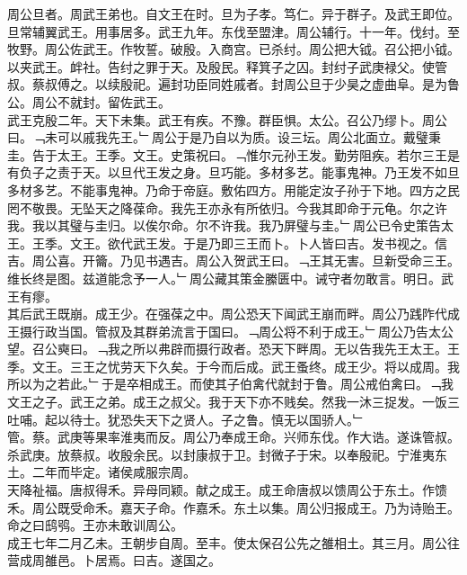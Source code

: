 \documentclass{zhvt-classic}
\begin{document}
\hspace*{2em}周公旦者。周武王弟也。自文王在时。旦为子孝。笃仁。异于群子。及武王即位。旦常辅翼武王。用事居多。武王九年。东伐至盟津。周公辅行。十一年。伐纣。至牧野。周公佐武王。作牧誓。破殷。入商宫。已杀纣。周公把大钺。召公把小钺。以夹武王。衅社。告纣之罪于天。及殷民。释箕子之囚。封纣子武庚禄父。使管叔。蔡叔傅之。以续殷祀。遍封功臣同姓戚者。封周公旦于少昊之虚曲阜。是为鲁公。周公不就封。留佐武王。\\
\hspace*{2em}武王克殷二年。天下未集。武王有疾。不豫。群臣惧。太公。召公乃缪卜。周公曰。﹁未可以戚我先王。﹂周公于是乃自以为质。设三坛。周公北面立。戴璧秉圭。告于太王。王季。文王。史策祝曰。﹁惟尔元孙王发。勤劳阻疾。若尔三王是有负子之责于天。以旦代王发之身。旦巧能。多材多艺。能事鬼神。乃王发不如旦多材多艺。不能事鬼神。乃命于帝庭。敷佑四方。用能定汝子孙于下地。四方之民罔不敬畏。无坠天之降葆命。我先王亦永有所依归。今我其即命于元龟。尔之许我。我以其璧与圭归。以俟尔命。尔不许我。我乃屏璧与圭。﹂周公已令史策告太王。王季。文王。欲代武王发。于是乃即三王而卜。卜人皆曰吉。发书视之。信吉。周公喜。开籥。乃见书遇吉。周公入贺武王曰。﹁王其无害。旦新受命三王。维长终是图。兹道能念予一人。﹂周公藏其策金縢匮中。诫守者勿敢言。明日。武王有瘳。\\
\hspace*{2em}其后武王既崩。成王少。在强葆之中。周公恐天下闻武王崩而畔。周公乃践阼代成王摄行政当国。管叔及其群弟流言于国曰。﹁周公将不利于成王。﹂周公乃告太公望。召公奭曰。﹁我之所以弗辟而摄行政者。恐天下畔周。无以告我先王太王。王季。文王。三王之忧劳天下久矣。于今而后成。武王蚤终。成王少。将以成周。我所以为之若此。﹂于是卒相成王。而使其子伯禽代就封于鲁。周公戒伯禽曰。﹁我文王之子。武王之弟。成王之叔父。我于天下亦不贱矣。然我一沐三捉发。一饭三吐哺。起以待士。犹恐失天下之贤人。子之鲁。慎无以国骄人。﹂\\
\hspace*{2em}管。蔡。武庚等果率淮夷而反。周公乃奉成王命。兴师东伐。作大诰。遂诛管叔。杀武庚。放蔡叔。收殷余民。以封康叔于卫。封微子于宋。以奉殷祀。宁淮夷东土。二年而毕定。诸侯咸服宗周。\\
\hspace*{2em}天降祉福。唐叔得禾。异母同颖。献之成王。成王命唐叔以馈周公于东土。作馈禾。周公既受命禾。嘉天子命。作嘉禾。东土以集。周公归报成王。乃为诗贻王。命之曰鸱鸮。王亦未敢训周公。\\
\hspace*{2em}成王七年二月乙未。王朝步自周。至丰。使太保召公先之雒相土。其三月。周公往营成周雒邑。卜居焉。曰吉。遂国之。\\
\end{document}
